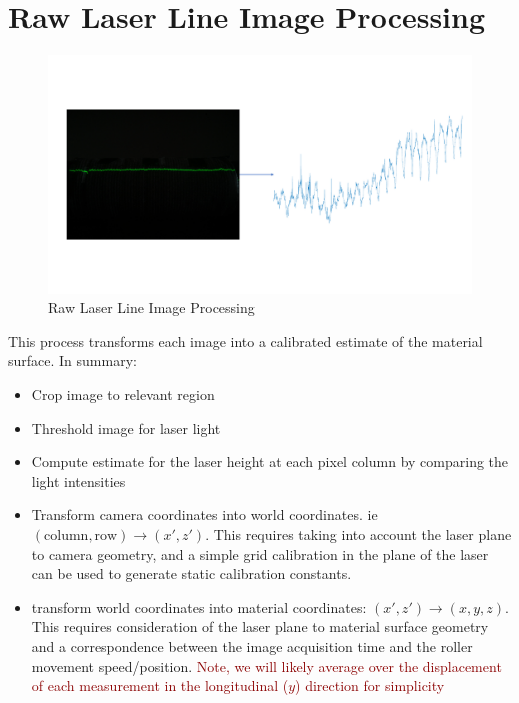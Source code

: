 \documentclass[12pt]{report}
\newcommand{\tcr}[1]{\textcolor{darkRed}{#1}}
\begin{document}
    \section{Raw Laser Line Image Processing}
        \begin{figure}[ht!]
            \centering
            \includegraphics[width=\textwidth,trim={0 5cm 0 5cm},clip]{figures/profile_measure/temp_height_measure.pdf}
            \caption{Raw Laser Line Image Processing}
        \end{figure}
        This process transforms each image into a calibrated estimate of the material surface. In summary:
        
        \begin{itemize}
            \item Crop image to relevant region
            \item Threshold image for laser light
            \item Compute estimate for the laser height at each pixel column by comparing the light intensities
            \item Transform camera coordinates into world coordinates.
            ie $(\text{column}, \text{row}) \rightarrow (x',z')$. This requires taking into account the laser plane to camera geometry, and a simple grid calibration in the plane of the laser can be used to generate static calibration constants.
            \item transform world coordinates into material coordinates: $(x',z') \rightarrow (x,y,z)$. This requires consideration of the laser plane to material surface geometry and a correspondence between the image acquisition time and the roller movement speed/position. \tcr{Note, we will likely average over the displacement of each measurement in the longitudinal ($y$) direction for simplicity}
        \end{itemize}
    
\end{document}
